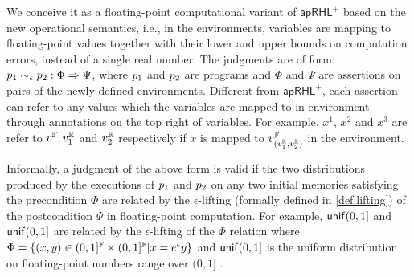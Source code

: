 \documentclass[a4paper,11pt]{article}
\begin{document}
We conceive it as a floating-point computational variant of $\mathsf{apRHL}^+$ based on the new operational semantics, i.e., in the environments, variables are mapping to floating-point values together with their lower and upper bounds on computation errors, instead of a single real number.
%
The judgments are of form:
$
p_1 \sim_{\epsilon} p_2: \Phi \Rightarrow \Psi
$,
where $p_1$ and $p_2$ are programs and $\Phi$ and $\Psi$ are assertions on pairs of the newly defined environments.
Different from $\mathsf{apRHL}^+$, each assertion can refer to any values which the variables are mapped to in environment through annotations on the top right of variables. 
For example, $x^1$, $x^2$ and $x^3$ are refer to $v^{\mathbb{F}}, v^{\mathbb{R}}_1$ and $v^{\mathbb{R}}_2$ respectively 
if $x$ is mapped to $v^{\mathbb{F}}_{(v^{\mathbb{R}}_1, v^{\mathbb{R}}_2)}$ in the environment.
%

Informally, a judgment of the above form is valid if the two distributions produced by the executions of 
$p_1$ and $p_2$ on any two initial memories satisfying the precondition $\Phi$ are related by the $\epsilon$-lifting (formally defined in \ref{def:lifting}) of the postcondition $\Psi$ in floating-point computation. 
% 
%
For example, $\mathsf{unif}(0, 1] $ and
$\mathsf{unif}(0, 1]$ are related by the $\epsilon$-lifting of the $\Phi$ relation where $\Phi = \{(x, y) \in (0, 1]^{\mathbb{F}} \times (0, 1]^{\mathbb{F}} | x = e^{\epsilon}y\}$
and $\mathsf{unif}(0, 1] $ is the uniform distribution on floating-point numbers range over $(0, 1]$ .
%
\end{document}
